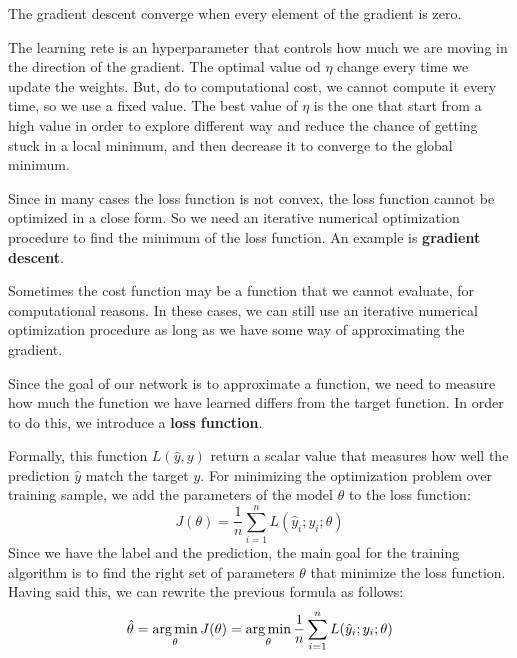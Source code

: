 \begin{note}
    The gradient descent converge when every element of the gradient is zero.
\end{note}

The learning rete is an hyperparameter that controls how much we are moving in the
direction of the gradient. The optimal value od $\eta$ change every time we update
the weights. But, do to computational cost, we cannot compute it every time, so we
use a fixed value. The best value of $\eta$ is the one that start from a high value
in order to explore different way and reduce the chance of getting stuck in a local
minimum, and then decrease it to converge to the global minimum.

Since in many cases the loss function is not convex, the loss function cannot be
optimized in a close form. So we need an iterative numerical optimization
procedure to find the minimum of the loss function. An example is \textbf{gradient
    descent}.

Sometimes the cost function may be a function that we cannot evaluate, for
computational reasons. In these cases, we can still use an iterative numerical
optimization procedure as long as we have some way of approximating the gradient.

Since the goal of our network is to approximate a function, we need to measure how
much the function we have learned differs from the target function. In order to
do this, we introduce a \textbf{loss function}.

Formally, this function $L(\hat{y}, y)$ return a scalar value that measures how
well the prediction $\hat{y}$ match the target $y$. For minimizing the optimization
problem over training sample, we add the parameters of the model $\theta$ to the
loss function:
\begin{equation}
    J(\theta) = \frac{1}{n} \sum_{i=1}^n L(\hat{y}_i; y_i; \theta)
\end{equation}
Since we have the label and the prediction, the main goal for the training algorithm
is to find the right set of parameters $\theta$ that minimize the loss function.
Having said this, we can rewrite the previous formula as follows:
\begin{equation}
    \hat{\theta} = \operatorname*{arg\,min}_{\theta} J(\theta) = \operatorname*{arg\,min}_{\theta} \frac{1}{n}
    \sum_{i=1}^n L(\hat{y}_i; y_i; \theta)
\end{equation}


